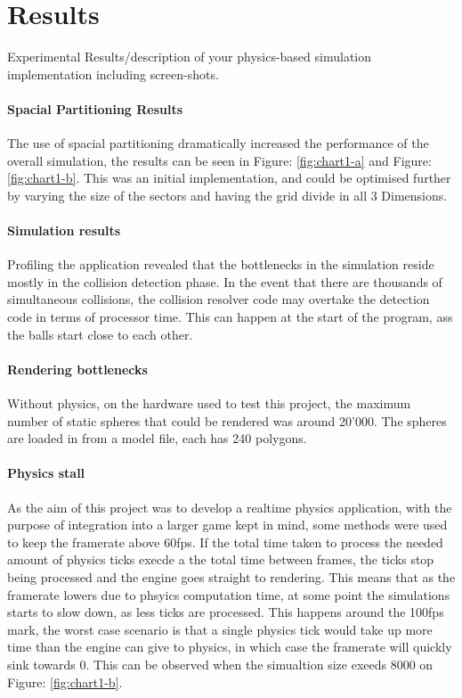 \documentclass[conference]{acmsiggraph}
\begin{document}
\section{Results}
Experimental Results/description of your physics-based simulation implementation
including screen-shots.


\paragraph{Spacial Partitioning Results}
The use of spacial partitioning dramatically increased the performance of the overall simulation, the results can be seen in Figure: \ref{fig:chart1-a} and Figure: \ref{fig:chart1-b}. 
This was an initial implementation, and could be optimised further by varying the size of the sectors and having the grid divide in all 3 Dimensions.

\paragraph{Simulation results}
Profiling the application revealed that the bottlenecks in the simulation reside mostly in the collision detection phase. In the event that there are thousands of simultaneous collisions, the collision resolver code may overtake the detection code in terms of processor time. This can happen at the start of the program, ass the balls start close to each other.

\paragraph{Rendering bottlenecks}
Without physics, on the hardware used to test this project, the maximum number of static spheres that could be rendered was around 20'000. The spheres are loaded in from a model file, each has 240 polygons.

\paragraph{Physics stall}
As the aim of this project was to develop a realtime physics application, with the purpose of integration into a larger game kept in mind, some methods were used to keep the framerate above 60fps. If the total time taken to process the needed amount of physics ticks execde a the total time between frames, the ticks stop being processed and the engine goes straight to rendering. This means that as the framerate lowers due to phsyics computation time, at some point the simulations starts to slow down, as less ticks are processed. This happens around the 100fps mark, the worst case scenario is that a single physics tick would take up more time than the engine can give to physics, in which case the framerate will quickly sink towards 0. This can be observed when the simualtion size exeeds 8000 on Figure: \ref{fig:chart1-b}.
\end{document}
